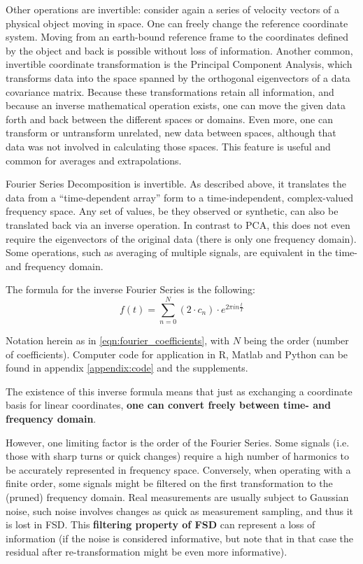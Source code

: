 \documentclass[10pt,a4paper]{article}
\begin{document}
Other operations are invertible: consider again a series of velocity vectors of a physical object moving in space.
One can freely change the reference coordinate system.
Moving from an earth-bound reference frame to the coordinates defined by the object and back is possible without loss of information.
Another common, invertible coordinate transformation is the Principal Component Analysis, which transforms data into the space spanned by the orthogonal eigenvectors of a data covariance matrix.
Because these transformations retain all information, and because an inverse mathematical operation exists, one can move the given data forth and back between the different spaces or domains.
Even more, one can transform or untransform unrelated, new data between spaces, although that data was not involved in calculating those spaces.
This feature is useful and common for averages and extrapolations.


Fourier Series Decomposition is invertible.
As described above, it translates the data from a ``time-dependent array'' form to a time-independent, complex-valued frequency space.
Any set of values, be they observed or synthetic, can also be translated back via an inverse operation.
In contrast to PCA, this does not even require the eigenvectors of the original data (there is only one frequency domain).
Some operations, such as averaging of multiple signals, are equivalent in the time- and frequency domain.

The formula for the inverse Fourier Series is the following:
\begin{equation}\label{eqn:fourier_inversion}
	f(t) = \sum\limits_{n=0}^{N} (2\cdot c_{n})\cdot e^{2\pi i n \frac{t}{T}}
\end{equation}

Notation herein as in \eqref{eqn:fourier_coefficients}, with \(N\) being the order (number of coefficients).
Computer code for application in R, Matlab and Python can be found in appendix \ref{appendix:code} and the supplements.

The existence of this inverse formula means that just as exchanging a coordinate basis for linear coordinates, \textbf{one can convert freely between time- and frequency domain}.


However, one limiting factor is the order of the Fourier Series.
Some signals (i.e. those with sharp turns or quick changes) require a high number of harmonics to be accurately represented in frequency space.
Conversely, when operating with a finite order, some signals might be filtered on the first transformation to the (pruned) frequency domain.
Real measurements are usually subject to Gaussian noise, such noise involves changes as quick as measurement sampling, and thus it is lost in FSD.
This \textbf{filtering property of FSD} can represent a loss of information (if the noise is considered informative, but note that in that case the residual after re-transformation might be even more informative).
\end{document}
